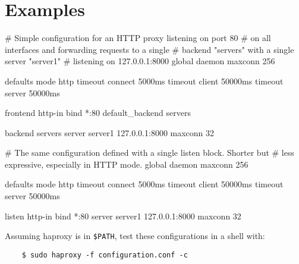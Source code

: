 
\section{Examples}

\begin{listing}{1}
# Simple configuration for an HTTP proxy listening on port 80
# on all interfaces and forwarding requests to a single 
# backend "servers" with a single server "server1"
# listening on 127.0.0.1:8000
global
    daemon
    maxconn 256

defaults
    mode http
    timeout connect 5000ms
    timeout client 50000ms
    timeout server 50000ms

frontend http-in
    bind *:80
    default_backend servers

backend servers
    server server1 127.0.0.1:8000 maxconn 32


# The same configuration defined with a single listen block. Shorter but
# less expressive, especially in HTTP mode.
global
    daemon
    maxconn 256

defaults
    mode http
    timeout connect 5000ms
    timeout client 50000ms
    timeout server 50000ms

listen http-in
    bind *:80
    server server1 127.0.0.1:8000 maxconn 32
\end{listing}

Assuming haproxy is in \verb|$PATH|, test these configurations in a shell with:
\begin{verbatim}
    $ sudo haproxy -f configuration.conf -c
\end{verbatim}
